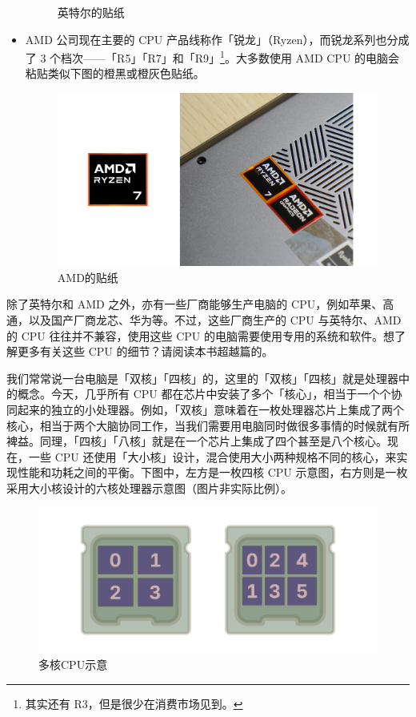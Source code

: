 \begin{itemize}
\begin{figure}[htb!]
      \caption{英特尔的贴纸}
      \label{fig:Intel_sticker}
    \end{figure}
  \item AMD 公司现在主要的 CPU 产品线称作「锐龙」（Ryzen），而锐龙系列也分成了 3 个档次——「R5」「R7」和「R9」\footnote{其实还有 R3，但是很少在消费市场见到。}。大多数使用 AMD CPU 的电脑会粘贴类似下图的橙黑或橙灰色贴纸。
    \begin{figure}[htb!]
      \centering
      \includegraphics[width=.6\textwidth]{assets/basic/AMD_sticker.png}
      \caption{AMD的贴纸}
      \label{fig:AMD_sticker}
    \end{figure}
\end{itemize}

\begin{note}
  除了英特尔和 AMD 之外，亦有一些厂商能够生产电脑的 CPU，例如苹果、高通，以及国产厂商龙芯、华为等。不过，这些厂商生产的 CPU 与英特尔、AMD 的 CPU 往往并不兼容，使用这些 CPU 的电脑需要使用专用的系统和软件。想了解更多有关这些 CPU 的细节？请阅读本书超越篇的。
\end{note}

我们常常说一台电脑是「双核」「四核」的，这里的「双核」「四核」就是处理器中的概念。今天，几乎所有 CPU 都在芯片中安装了多个「核心」，相当于一个个协同起来的独立的小处理器。例如，「双核」意味着在一枚处理器芯片上集成了两个核心，相当于两个大脑协同工作，当我们需要用电脑同时做很多事情的时候就有所裨益。同理，「四核」「八核」就是在一个芯片上集成了四个甚至是八个核心。现在，一些 CPU 还使用「大小核」设计，混合使用大小两种规格不同的核心，来实现性能和功耗之间的平衡。下图中，左方是一枚四核 CPU 示意图，右方则是一枚采用大小核设计的六核处理器示意图（图片非实际比例）。

\begin{figure}[htb!]
  \centering
  \includegraphics[width=.6\textwidth]{assets/basic/Multicore.pdf}
  \caption{多核CPU示意}
  \label{fig:Multicore}
\end{figure}

